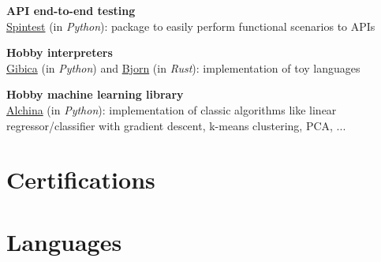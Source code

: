 \documentclass[11pt,a4paper,sans]{moderncv} %
\begin{document}
\textbf{API end-to-end testing}\\
\href{https://github.com/societe-generale/spintest}{Spintest} (in \emph{Python}): package to easily perform functional scenarios to APIs
\vspace{+0.25cm}

\textbf{Hobby interpreters}\\
\href{https://github.com/matthieugouel/gibica}{Gibica} (in \emph{Python}) and \href{https://github.com/matthieugouel/bjorn}{Bjorn} (in \emph{Rust}): implementation of toy languages
\vspace{0.25cm}

\textbf{Hobby machine learning library}\\
\href{https://github.com/matthieugouel/alchina}{Alchina} (in \emph{Python}): implementation of classic algorithms like linear regressor/classifier with gradient descent, k-means clustering, PCA, ... 


\section{Certifications}



\section{Languages}

\end{document}
